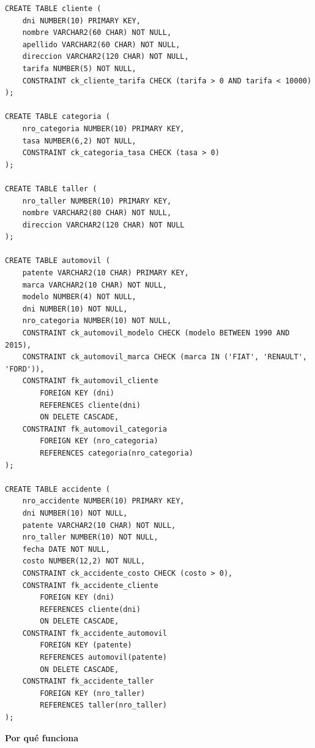 \documentclass[11pt,a4paper]{article}
\newcommand{\itemcabecera}[1]{\noindent\textbf{#1}\par\medskip}
\newcommand{\bloquePorque}{\itemcabecera{Por qu\'e funciona}}
\begin{document}
\begin{lstlisting}
CREATE TABLE cliente (
    dni NUMBER(10) PRIMARY KEY,
    nombre VARCHAR2(60 CHAR) NOT NULL,
    apellido VARCHAR2(60 CHAR) NOT NULL,
    direccion VARCHAR2(120 CHAR) NOT NULL,
    tarifa NUMBER(5) NOT NULL,
    CONSTRAINT ck_cliente_tarifa CHECK (tarifa > 0 AND tarifa < 10000)
);

CREATE TABLE categoria (
    nro_categoria NUMBER(10) PRIMARY KEY,
    tasa NUMBER(6,2) NOT NULL,
    CONSTRAINT ck_categoria_tasa CHECK (tasa > 0)
);

CREATE TABLE taller (
    nro_taller NUMBER(10) PRIMARY KEY,
    nombre VARCHAR2(80 CHAR) NOT NULL,
    direccion VARCHAR2(120 CHAR) NOT NULL
);

CREATE TABLE automovil (
    patente VARCHAR2(10 CHAR) PRIMARY KEY,
    marca VARCHAR2(10 CHAR) NOT NULL,
    modelo NUMBER(4) NOT NULL,
    dni NUMBER(10) NOT NULL,
    nro_categoria NUMBER(10) NOT NULL,
    CONSTRAINT ck_automovil_modelo CHECK (modelo BETWEEN 1990 AND 2015),
    CONSTRAINT ck_automovil_marca CHECK (marca IN ('FIAT', 'RENAULT', 'FORD')),
    CONSTRAINT fk_automovil_cliente
        FOREIGN KEY (dni)
        REFERENCES cliente(dni)
        ON DELETE CASCADE,
    CONSTRAINT fk_automovil_categoria
        FOREIGN KEY (nro_categoria)
        REFERENCES categoria(nro_categoria)
);

CREATE TABLE accidente (
    nro_accidente NUMBER(10) PRIMARY KEY,
    dni NUMBER(10) NOT NULL,
    patente VARCHAR2(10 CHAR) NOT NULL,
    nro_taller NUMBER(10) NOT NULL,
    fecha DATE NOT NULL,
    costo NUMBER(12,2) NOT NULL,
    CONSTRAINT ck_accidente_costo CHECK (costo > 0),
    CONSTRAINT fk_accidente_cliente
        FOREIGN KEY (dni)
        REFERENCES cliente(dni)
        ON DELETE CASCADE,
    CONSTRAINT fk_accidente_automovil
        FOREIGN KEY (patente)
        REFERENCES automovil(patente)
        ON DELETE CASCADE,
    CONSTRAINT fk_accidente_taller
        FOREIGN KEY (nro_taller)
        REFERENCES taller(nro_taller)
);
\end{lstlisting}

\bloquePorque
\end{document}

